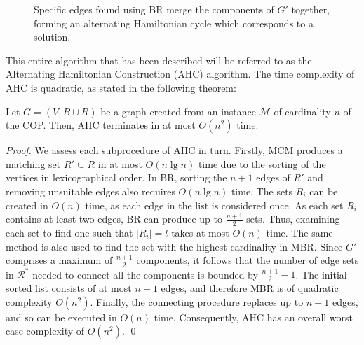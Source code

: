 \documentclass[runningheads]{llncs}
\begin{document}
\begin{figure}[H]	
	\centering
	\begin{subfigure}[h]{0.65\textwidth}
			
		\label{fig:mpsconnect}
	\end{subfigure}
	\begin{subfigure}[h]{0.65\textwidth}
		
		\label{fig:mpscycle}
	\end{subfigure}
	\begin{subfigure}[h]{0.75\textwidth}
		
		\label{fig:mpspath}
	\end{subfigure}
	\caption{Specific edges found using BR merge the components of $G'$ together, forming an alternating Hamiltonian cycle which corresponds to a solution.}
	\label{fig:connect/cycle}
\end{figure}

\noindent This entire algorithm that has been described will be referred to as the Alternating Hamiltonian Construction (AHC) algorithm. The time complexity of AHC is quadratic, as stated in the following theorem:

\begin{theorem}
	\label{thm:copsoln}
	Let $G=(V, B \cup R)$ be a graph created from an instance $\mathcal{M}$ of cardinality $n$ of the COP. Then, AHC terminates in at most $O(n^2)$ time.
\end{theorem}

\begin{proof}
	We assess each subprocedure of AHC in turn. Firstly, MCM produces a matching set $R' \subseteq R$ in at most $O(n \lg n)$ time due to the sorting of the vertices in lexicographical order. In BR, sorting the $n+1$ edges of $R'$ and removing unsuitable edges also requires $O(n \lg n)$ time. The sets $R_i$ can be created in $O(n)$ time, as each edge in the list is considered once. As each set $R_i$ contains at least two edges, BR can produce up to $\frac{n+1}{2}$ sets. Thus, examining each set to find one such that $|R_i| = l$ takes at most $O(n)$ time. The same method is also used to find the set with the highest cardinality in MBR. Since $G'$ comprises a maximum of $\frac{n+1}{2}$ components, it follows that the number of edge sets in $\mathcal{R}^{*}$ needed to connect all the components is bounded by $\frac{n+1}{2}-1$. The initial sorted list consists of at most $n-1$ edges, and therefore MBR is of quadratic complexity $O(n^2)$. Finally, the connecting procedure replaces up to $n+1$ edges, and so can be executed in $O(n)$ time. Consequently, AHC has an overall worst case complexity of $O(n^2)$. \qed
\end{proof}	
\end{document}
